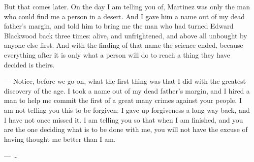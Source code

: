 But that comes later. On the day I am telling you of, Martinez was only the man who could find me a person in a desert. And I gave him a name out of my dead father's margin, and told him to bring me the man who had turned Edward Blackwood back three times: alive, and unfrightened, and above all unbought by anyone else first. And with the finding of that name the science ended, because everything after it is only what a person will do to reach a thing they have decided is theirs.\par

\begin{room}

--- Notice, before we go on, what the first thing was that I did with the greatest discovery of the age. I took a name out of my dead father's margin, and I hired a man to help me commit the first of a great many crimes against your people. I am not telling you this to be forgiven; I gave up forgiveness a long way back, and I have not once missed it. I am telling you so that when I am finished, and you are the one deciding what is to be done with me, you will not have the excuse of having thought me better than I am.

--- \ldots{}

\end{room}
